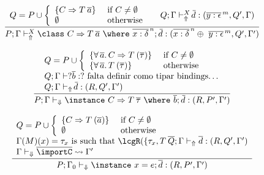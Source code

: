 \begin{figure}
\[ \begin{array}{cc}
	\displaystyle\frac
	 {\begin{array}{ll}
            Q = P \cup \left\{ \begin{array}{ll}
                                  \{ C \Rightarrow T\:\overline{a} \} & \text{ if } C \not= \emptyset \\
                                  \emptyset                              & \text{ otherwise}
                                \end{array}\right.\: & \:
            Q;\Gamma \vdash_{\Uparrow}^X \overline{\!d} : (\overline{y:\epsilon}^{\,m}, Q', \Gamma)
          \end{array}}
	 {P;\Gamma \vdash_{\Uparrow}^X \class\ C \Rightarrow T\: \overline{a}\ \where\ \overline{x:\delta}^{\,n};\, \overline{\!d} : 
            (\overline{x:\delta}^{\,n} \oplus\ \overline{y:\epsilon}^{\,m}, Q', \Gamma')} \\ \\

	\displaystyle\frac
	 {\begin{array}{l}
            Q = P \cup \left \{ \begin{array}{ll}
                         \{ \forall\,\overline{a}.\,C \Rightarrow T\: (\overline{\tau}) \} & \text{ if } C \not= \emptyset \\
                         \{ \forall\,\overline{a}.\,T\: (\overline{\tau}) \} & \text{ otherwise}
                                \end{array}\right. \\
           Q;\Gamma \vdash? \overline{b} : ? \text{ falta definir como tipar bindings\ldots} \\
	   Q;\Gamma \vdash_{\Uparrow} \overline{\!d} : (R,Q',\Gamma') \\
          \end{array}}
	 {P;\Gamma \vdash_{\Downarrow} \instance\ C \Rightarrow T\:\overline{\tau}\ \where\ \overline{b};\, \overline{\!d} 
             : (R,P',\Gamma')}\\ \\

	\displaystyle\frac
	 {\begin{array}{l}
            Q = P \cup \left\{ \begin{array}{ll}
                                  \{ C \Rightarrow T\: (\overline{a}) \} & \text{ if } C \not= \emptyset \\
                                  \emptyset                              & \text{ otherwise}
                                \end{array}\right. \\
            \Gamma(M)(x) = \tau_x \text{ is such that } \lcgR(\{ \tau_x, T\:\overline
	   Q;\Gamma \vdash_{\Uparrow} \overline{d} : (R,Q',\Gamma') \\
           \Gamma \vdash_{\Downarrow} \overline{\importC} \leadsto \Gamma'
          \end{array}}
	 {P;\Gamma_0 \vdash_{\Downarrow} \instance\ x = e; \overline{d} : (R,P',\Gamma')} 


\end{array}\]
\end{figure}
